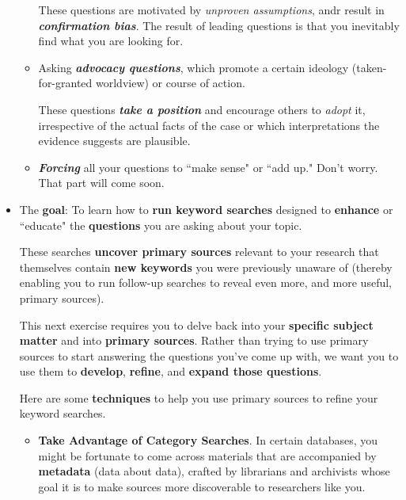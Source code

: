 \documentclass[11pt]{article}
\begin{document}
\begin{itemize}
\begin{itemize}
These questions are motivated by \emph{unproven assumptions}, andr result in \emph{\textbf{confirmation bias}}. The result of leading questions is that you inevitably find what you are looking for. 
 
\item Asking \emph{\textbf{advocacy questions}}, which promote a certain ideology (taken-for-granted worldview) or course of action.

These questions \emph{\textbf{take a position}} and encourage others to \emph{adopt} it, irrespective of the actual facts of the case or which interpretations the evidence suggests are plausible. 

\item \emph{\textbf{Forcing}} all your questions to ``make sense" or ``add up." Don’t worry. That part will come soon.
\end{itemize}

\vspace{20pt}
\item \begin{exercise}

The \textbf{goal}: To learn how to \textbf{run keyword searches} designed to \textbf{enhance} or ``educate" the \textbf{questions} you are asking about
your topic. 

These searches \textbf{uncover primary sources} relevant to your research that themselves contain \textbf{new keywords} you were previously unaware of (thereby enabling you to run follow-up searches to reveal even more, and more useful, primary sources).

This next exercise requires you to delve back into your \textbf{specific subject matter} and into \textbf{primary sources}. Rather than trying to use primary sources to start answering the questions you’ve come up with, we want you to use them to \textbf{develop}, \textbf{refine}, and \textbf{expand those questions}.

Here are some \textbf{techniques} to help you use primary sources to refine your keyword searches.
\begin{itemize}
\item \textbf{Take Advantage of Category Searches}. In certain databases, you might be fortunate to come across materials that are accompanied by \textbf{metadata} (data about data), crafted by librarians and archivists whose goal it is to make sources more discoverable to researchers like you. 


\end{itemize}
\end{exercise}
\end{itemize}
\end{document}

